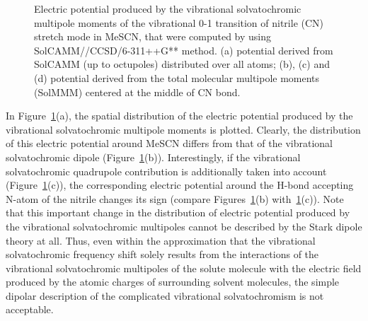 \documentclass[a4paper,titlepage,twoside,fleqn,12pt]{book}
\begin{document}
\begin{refsection}
%
\begin{figure}[t!]
\centering
\setlength\fboxsep{0.4pt}
\setlength\fboxrule{0.5pt}
\caption{
Electric potential produced by the vibrational solvatochromic multipole moments of the vibrational 0-1
transition of nitrile (CN) stretch mode in MeSCN, that were computed by using 
SolCAMM//CCSD/6-311++G** method. (a) potential derived from SolCAMM (up to octupoles) distributed over all 
atoms; (b), (c) and (d) potential derived from the total molecular multipole moments (SolMMM) centered at the middle
of CN bond.
\label{f:mescn-maps}}
\end{figure}
%
In Figure~\ref{f:mescn-maps}(a), the spatial distribution of the electric
potential produced by the vibrational solvatochromic
multipole moments is plotted. Clearly, the distribution of this
electric potential around MeSCN differs from that of the
vibrational solvatochromic dipole (Figure~\ref{f:mescn-maps}(b)). Interestingly, if
the vibrational solvatochromic quadrupole contribution is
additionally taken into account (Figure~\ref{f:mescn-maps}(c)), the corresponding
electric potential around the H-bond accepting N-atom of the
nitrile changes its sign (compare Figures~\ref{f:mescn-maps}(b) with~\ref{f:mescn-maps}(c)). Note
that this important change in the distribution of electric
potential produced by the vibrational solvatochromic
multipoles cannot be described by the Stark dipole theory at
all. Thus, even within the approximation that the vibrational
solvatochromic frequency shift solely results from the
interactions of the vibrational solvatochromic multipoles of
the solute molecule with the electric field produced by the
atomic charges of surrounding solvent molecules, the simple
dipolar description of the complicated vibrational
solvatochromism is not acceptable.


\end{refsection}
\end{document}
